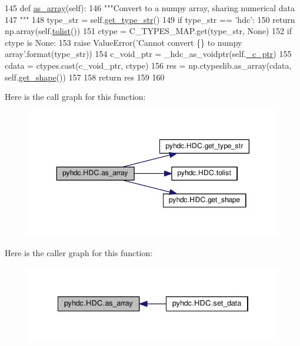\begin{DoxyCode}
145     \textcolor{keyword}{def }\hyperlink{a00002_a25c3660aa475054863838e9af3feae4b}{as\_array}(self):
146         \textcolor{stringliteral}{"""Convert to a numpy array, sharing numerical data}
147 \textcolor{stringliteral}{        """}
148         type\_str = self.\hyperlink{a00002_a713e9156f96be1d70589536fe8466980}{get\_type\_str}()
149         \textcolor{keywordflow}{if} type\_str == \textcolor{stringliteral}{'hdc'}:
150             \textcolor{keywordflow}{return} np.array(self.\hyperlink{a00002_a75eee53f2cdacdb2e6489d807781fb45}{tolist}())
151         ctype = C\_TYPES\_MAP.get(type\_str, \textcolor{keywordtype}{None})
152         \textcolor{keywordflow}{if} ctype \textcolor{keywordflow}{is} \textcolor{keywordtype}{None}:
153             \textcolor{keywordflow}{raise} ValueError(\textcolor{stringliteral}{'Cannot convert \{\} to numpy array'}.format(type\_str))
154         c\_void\_ptr = \_hdc\_as\_voidptr(self.\hyperlink{a00002_ae96f30f5f5f55edcba46297da4e37d61}{\_c\_ptr})
155         cdata = ctypes.cast(c\_void\_ptr, ctype)
156         res = np.ctypeslib.as\_array(cdata, self.\hyperlink{a00002_a2d338e04a2dac45cc0c14238236573d2}{get\_shape}())
157 
158         \textcolor{keywordflow}{return} res
159 
160 
\end{DoxyCode}


Here is the call graph for this function\+:
\nopagebreak
\begin{figure}[H]
\begin{center}
\leavevmode
\includegraphics[width=350pt]{a00002_a25c3660aa475054863838e9af3feae4b_cgraph}
\end{center}
\end{figure}




Here is the caller graph for this function\+:
\nopagebreak
\begin{figure}[H]
\begin{center}
\leavevmode
\includegraphics[width=334pt]{a00002_a25c3660aa475054863838e9af3feae4b_icgraph}
\end{center}
\end{figure}


